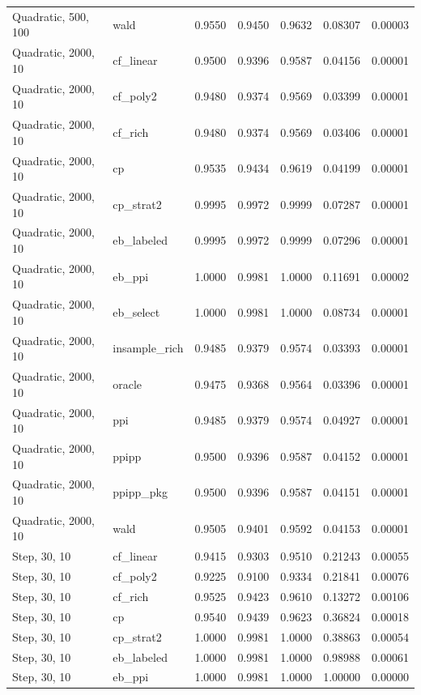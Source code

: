 \begin{longtable}{llrrrrr}
Quadratic, 500, 100 & wald & 0.9550 & 0.9450 & 0.9632 & 0.08307 & 0.00003 \\
Quadratic, 2000, 10 & cf\_linear & 0.9500 & 0.9396 & 0.9587 & 0.04156 & 0.00001 \\
Quadratic, 2000, 10 & cf\_poly2 & 0.9480 & 0.9374 & 0.9569 & 0.03399 & 0.00001 \\
Quadratic, 2000, 10 & cf\_rich & 0.9480 & 0.9374 & 0.9569 & 0.03406 & 0.00001 \\
Quadratic, 2000, 10 & cp & 0.9535 & 0.9434 & 0.9619 & 0.04199 & 0.00001 \\
Quadratic, 2000, 10 & cp\_strat2 & 0.9995 & 0.9972 & 0.9999 & 0.07287 & 0.00001 \\
Quadratic, 2000, 10 & eb\_labeled & 0.9995 & 0.9972 & 0.9999 & 0.07296 & 0.00001 \\
Quadratic, 2000, 10 & eb\_ppi & 1.0000 & 0.9981 & 1.0000 & 0.11691 & 0.00002 \\
Quadratic, 2000, 10 & eb\_select & 1.0000 & 0.9981 & 1.0000 & 0.08734 & 0.00001 \\
Quadratic, 2000, 10 & insample\_rich & 0.9485 & 0.9379 & 0.9574 & 0.03393 & 0.00001 \\
Quadratic, 2000, 10 & oracle & 0.9475 & 0.9368 & 0.9564 & 0.03396 & 0.00001 \\
Quadratic, 2000, 10 & ppi & 0.9485 & 0.9379 & 0.9574 & 0.04927 & 0.00001 \\
Quadratic, 2000, 10 & ppipp & 0.9500 & 0.9396 & 0.9587 & 0.04152 & 0.00001 \\
Quadratic, 2000, 10 & ppipp\_pkg & 0.9500 & 0.9396 & 0.9587 & 0.04151 & 0.00001 \\
Quadratic, 2000, 10 & wald & 0.9505 & 0.9401 & 0.9592 & 0.04153 & 0.00001 \\
Step, 30, 10 & cf\_linear & 0.9415 & 0.9303 & 0.9510 & 0.21243 & 0.00055 \\
Step, 30, 10 & cf\_poly2 & 0.9225 & 0.9100 & 0.9334 & 0.21841 & 0.00076 \\
Step, 30, 10 & cf\_rich & 0.9525 & 0.9423 & 0.9610 & 0.13272 & 0.00106 \\
Step, 30, 10 & cp & 0.9540 & 0.9439 & 0.9623 & 0.36824 & 0.00018 \\
Step, 30, 10 & cp\_strat2 & 1.0000 & 0.9981 & 1.0000 & 0.38863 & 0.00054 \\
Step, 30, 10 & eb\_labeled & 1.0000 & 0.9981 & 1.0000 & 0.98988 & 0.00061 \\
Step, 30, 10 & eb\_ppi & 1.0000 & 0.9981 & 1.0000 & 1.00000 & 0.00000 \\

\end{longtable}
